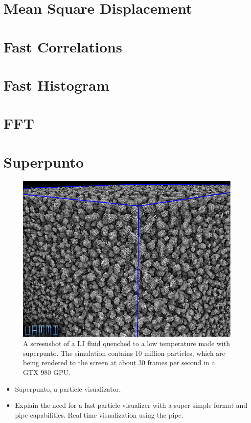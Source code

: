 \documentclass[ twoside,openright,titlepage,numbers=noenddot,%
headinclude,footinclude,cleardoublepage=empty,abstract=on,
BCOR=5mm,paper=a4,fontsize=11pt, dvipsnames
]{scrreprt}
\newcommand{\gpu}{\gls{GPU}\xspace}
\begin{document}
\chapter{Mean Square Displacement}
\chapter{Fast Correlations}
\chapter{Fast Histogram}
\chapter{FFT}


\chapter{Superpunto}
\begin{figure}[H]
  \label{fig:spunto}
  \centering
  \includegraphics[width=\textwidth]{gfx/shotlogo}
  \caption{A screenshot of a \gls{LJ} fluid quenched to a low temperature made with superpunto. The simulation contains $10$ million particles, which are being rendered to the screen at about 30 frames per second in a GTX 980 \gpu.}
\end{figure}

\begin{itemize}
\item Superpunto, a particle visualizator.
\item Explain the need for a fast particle visualizer with a super simple format and pipe capabilities. Real time visualization using the pipe.
  
\end{itemize}
\end{document}
